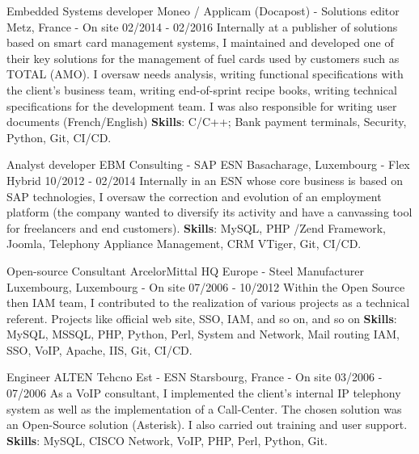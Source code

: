 \begin{cventries}
  \cventry
    {Embedded Systems developer} %
    {Moneo / Applicam (Docapost) - Solutions editor} %
    {Metz, France - On site} %
    {02/2014 - 02/2016} %
    {
        Internally at a publisher of solutions based on smart card management systems, 
        I maintained and developed one of their key solutions for the management of 
        fuel cards used by customers such as TOTAL (AMO).
        \newline
        I oversaw needs analysis, writing functional specifications with the client's 
        business team, writing end-of-sprint recipe books, writing technical specifications 
        for the development team. 
        \newline
        I was also responsible for writing user documents (French/English)
        \newline
        \textbf{Skills}: C/C++; Bank payment terminals, Security, Python, Git, CI/CD.
    }

  \cventry
    {Analyst developer} %
    {EBM Consulting - SAP ESN} %
    {Basacharage, Luxembourg - Flex Hybrid} %
    {10/2012 - 02/2014} %
    {
        Internally in an ESN whose core business is based on SAP technologies, I oversaw the correction 
        and evolution of an employment platform (the company wanted to diversify its activity and have 
        a canvassing tool for freelancers and end customers).
        \newline
        \textbf{Skills}: MySQL, PHP /Zend Framework, Joomla, Telephony Appliance Management,
        CRM VTiger, Git, CI/CD.
    }

  \cventry
    {Open-source Consultant} %
    {ArcelorMittal HQ Europe - Steel Manufacturer} %
    {Luxembourg, Luxembourg - On site} %
    {07/2006 - 10/2012} %
    {
        Within the Open Source then IAM team, I contributed to the realization of various projects as a technical referent.
        Projects like official web site, SSO, IAM, and so on, and so on
        \newline
        \textbf{Skills}: MySQL, MSSQL, PHP, Python, Perl, System and Network, Mail routing
        IAM, SSO, VoIP, Apache, IIS, Git, CI/CD.
    }

  \cventry
    {Engineer} %
    {ALTEN Tehcno Est - ESN} %
    {Starsbourg, France - On site} %
    {03/2006 - 07/2006} %
    {
        As a VoIP consultant, I implemented the client's internal IP telephony system 
        as well as the implementation of a Call-Center. The chosen solution was an 
        Open-Source solution (Asterisk). 
        \newline
        I also carried out training and user support.
        \newline
        \textbf{Skills}: MySQL, CISCO Network, VoIP, PHP, Perl, Python, Git.
    }


\end{cventries}
